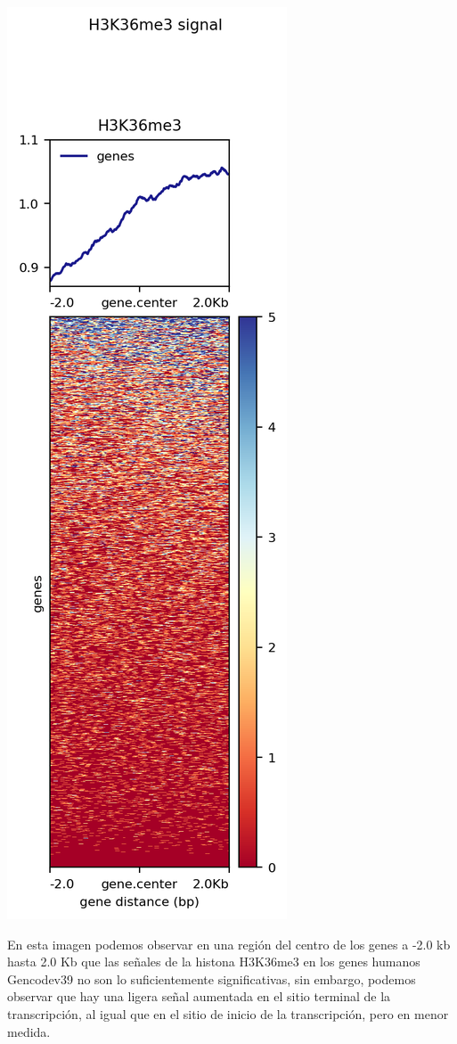 \documentclass[
]{article}
\begin{document}
\includegraphics{./T04_images/H3K36me3_genes.png}

En esta imagen podemos observar en una región del centro de los genes a
-2.0 kb hasta 2.0 Kb que las señales de la histona H3K36me3 en los genes
humanos Gencodev39 no son lo suficientemente significativas, sin
embargo, podemos observar que hay una ligera señal aumentada en el sitio
terminal de la transcripción, al igual que en el sitio de inicio de la
transcripción, pero en menor medida.
\end{document}
